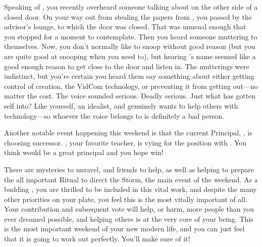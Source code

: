 \documentclass[char]{GL2020}
\begin{document}
Speaking of \cTechStar{}, you recently overheard someone talking about  \cTechStar{\them} on the other side of a closed door. On your way out from stealing the papers from \cBunker{}, you passed by the advisor's lounge, to which the door was closed. That was unusual enough that you stopped for a moment to contemplate. Then you heard someone muttering to themselves. Now, you don't normally like to snoop without good reason (but you are quite good at snooping when you need to), but hearing \cTechStar{}'s name seemed like a good enough reason to get close to the door and listen in. The mutterings were indistinct, but you're certain you heard them say something about either getting control of \cTechStar{\their} creation, the VidCom technology, or preventing it from getting out---no matter the cost. The voice sounded serious. Deadly serious. Just what has \cTechStar{\they} gotten \cTechStar{\their}self into? Like yourself, \cTechStar{\they} \cTechStar{\are} an idealist, and genuinely wants to help others with \cTechStar{\their} technology---so whoever the voice belongs to is definitely a bad person.

Another notable event happening this weekend is that the current Principal, \cPrincipal{\full}, is choosing \cPrincipal{\their} successor. \cMusic{\full}, your favorite teacher, is vying for the position with \cBeetle{\full}. You think \cMusic{} would be a great principal and you hope \cMusic{\they} win\cMusic{\plural}!

There are mysteries to unravel, and friends to help, as well as helping to prepare the all important Ritual to direct the Storm, the main event of the weekend.  As a budding \cDisney{\cleric}, you are thrilled to be included in this vital work, and despite the many other priorities on your plate, you feel this is the most vitally important of all. Your contribution and subsequent vote will help, or harm, more people than you ever dreamed possible, and helping others is at the very core of your being. This is the most important weekend of your new modern life, and you can just feel that it is going to work out perfectly. You'll make sure of it!
\end{document}
